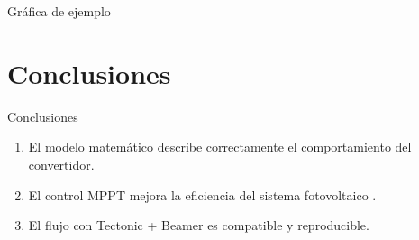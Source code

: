 \begin{frame}{Gráfica de ejemplo}
    \begin{center}
    \end{center}
\end{frame}

\section{Conclusiones}

\begin{frame}{Conclusiones}
    \begin{enumerate}
        \item El modelo matemático describe correctamente el comportamiento del convertidor.
        \item El control MPPT mejora la eficiencia del sistema fotovoltaico \cite{mppt2020}.
        \item El flujo con Tectonic + Beamer es compatible y reproducible.
    \end{enumerate}
\end{frame}